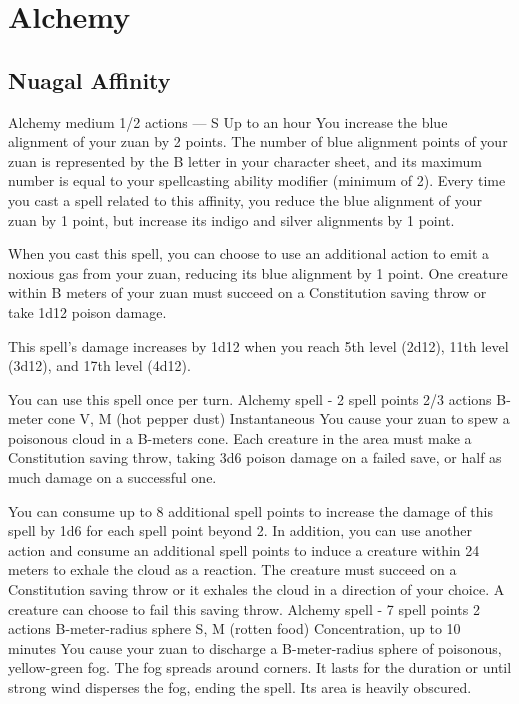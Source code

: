 \section{Alchemy}
\subsection*{Nuagal Affinity}
        {Alchemy medium}
        {1/2 actions}
        {---}
        {S}
        {Up to an hour}
        You increase the blue alignment of your zuan by 2 points.
        The number of blue alignment points of your zuan is represented by the B letter in your character sheet, and its maximum number is equal to your spellcasting ability modifier (minimum of 2).
        Every time you cast a spell related to this affinity, you reduce the blue alignment of your zuan by 1 point, but increase its indigo and silver alignments by 1 point.

        When you cast this spell, you can choose to use an additional action to emit a noxious gas from your zuan, reducing its blue alignment by 1 point.
        One creature within B meters of your zuan must succeed on a Constitution saving throw or take 1d12 poison damage.

        This spell's damage increases by 1d12 when you reach 5th level (2d12), 11th level (3d12), and 17th level (4d12).

        You can use this spell once per turn.
        {Alchemy spell - 2 spell points}
        {2/3 actions}
        {B-meter cone}
        {V, M (hot pepper dust)}
        {Instantaneous}
        You cause your zuan to spew a poisonous cloud in a B-meters cone.
        Each creature in the area must make a Constitution saving throw, taking 3d6 poison damage on a failed save, or half as much damage on a successful one.

        You can consume up to 8 additional spell points to increase the damage of this spell by 1d6 for each spell point beyond 2.
        In addition, you can use another action and consume an additional spell points to induce a creature within 24 meters to exhale the cloud as a reaction.
        The creature must succeed on a Constitution saving throw or it exhales the cloud in a direction of your choice.
        A creature can choose to fail this saving throw.
        {Alchemy spell - 7 spell points}
        {2 actions}
        {B-meter-radius sphere}
        {S, M (rotten food)}
        {Concentration, up to 10 minutes}
        You cause your zuan to discharge a B-meter-radius sphere of poisonous, yellow-green fog.
        The fog spreads around corners.
        It lasts for the duration or until strong wind disperses the fog, ending the spell.
        Its area is heavily obscured.

